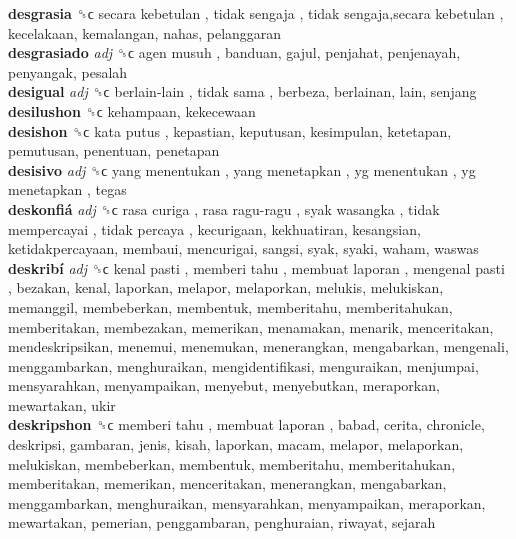 \textbf{desgrasia} ␝ϲ   secara kebetulan ,  tidak sengaja ,  tidak sengaja,secara kebetulan , kecelakaan, kemalangan, nahas, pelanggaran  \\
\textbf{desgrasiado} \emph{adj}  ␝ϲ   agen musuh , banduan, gajul, penjahat, penjenayah, penyangak, pesalah  \\
\textbf{desigual} \emph{adj}  ␝ϲ   berlain-lain ,  tidak sama , berbeza, berlainan, lain, senjang  \\
\textbf{desilushon} ␝ϲ  kehampaan, kekecewaan  \\
\textbf{desishon} ␝ϲ   kata putus , kepastian, keputusan, kesimpulan, ketetapan, pemutusan, penentuan, penetapan  \\
\textbf{desisivo} \emph{adj}  ␝ϲ   yang menentukan ,  yang menetapkan ,  yg menentukan ,  yg menetapkan , tegas  \\
\textbf{deskonfiá} \emph{adj}  ␝ϲ   rasa curiga ,  rasa ragu-ragu ,  syak wasangka ,  tidak mempercayai ,  tidak percaya , kecurigaan, kekhuatiran, kesangsian, ketidakpercayaan, membaui, mencurigai, sangsi, syak, syaki, waham, waswas  \\
\textbf{deskribí} \emph{adj}  ␝ϲ   kenal pasti ,  memberi tahu ,  membuat laporan ,  mengenal pasti , bezakan, kenal, laporkan, melapor, melaporkan, melukis, melukiskan, memanggil, membeberkan, membentuk, memberitahu, memberitahukan, memberitakan, membezakan, memerikan, menamakan, menarik, menceritakan, mendeskripsikan, menemui, menemukan, menerangkan, mengabarkan, mengenali, menggambarkan, menghuraikan, mengidentifikasi, menguraikan, menjumpai, mensyarahkan, menyampaikan, menyebut, menyebutkan, meraporkan, mewartakan, ukir  \\
\textbf{deskripshon} ␝ϲ   memberi tahu ,  membuat laporan , babad, cerita, chronicle, deskripsi, gambaran, jenis, kisah, laporkan, macam, melapor, melaporkan, melukiskan, membeberkan, membentuk, memberitahu, memberitahukan, memberitakan, memerikan, menceritakan, menerangkan, mengabarkan, menggambarkan, menghuraikan, mensyarahkan, menyampaikan, meraporkan, mewartakan, pemerian, penggambaran, penghuraian, riwayat, sejarah  \\
